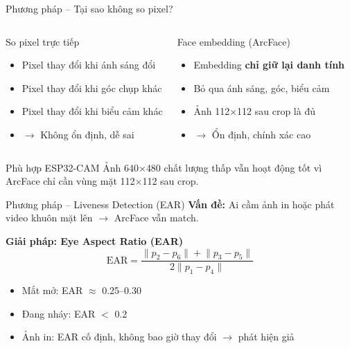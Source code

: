 \documentclass[aspectratio=169]{beamer}
\begin{document}
\begin{frame}{Phương pháp -- Tại sao không so pixel?}
  \begin{columns}[T]
      \begin{alertblock}{So pixel trực tiếp}
        \begin{itemize}
          \item Pixel thay đổi khi ánh sáng đổi
          \item Pixel thay đổi khi góc chụp khác
          \item Pixel thay đổi khi biểu cảm khác
          \item $\to$ Không ổn định, dễ sai
        \end{itemize}
      \end{alertblock}

      \begin{block}{Face embedding (ArcFace)}
        \begin{itemize}
          \item Embedding \textbf{chỉ giữ lại danh tính}
          \item Bỏ qua ánh sáng, góc, biểu cảm
          \item Ảnh 112$\times$112 sau crop là đủ
          \item $\to$ Ổn định, chính xác cao
        \end{itemize}
      \end{block}
  \end{columns}

  \vspace{0.6em}
  \begin{block}{Phù hợp ESP32-CAM}
    Ảnh 640$\times$480 chất lượng thấp vẫn hoạt động tốt vì ArcFace chỉ cần vùng mặt 112$\times$112 sau crop.
  \end{block}
\end{frame}

\begin{frame}{Phương pháp -- Liveness Detection (EAR)}
  \textbf{Vấn đề:} Ai cầm ảnh in hoặc phát video khuôn mặt lên $\to$ ArcFace vẫn match.

  \vspace{0.5em}
  \textbf{Giải pháp: Eye Aspect Ratio (EAR)}
  \[
    \text{EAR} = \frac{\lVert p_2-p_6\rVert + \lVert p_3-p_5\rVert}{2\lVert p_1-p_4\rVert}
  \]

  \begin{itemize}
    \item Mắt mở: EAR $\approx$ 0.25--0.30
    \item Đang nháy: EAR $<$ 0.2
    \item Ảnh in: EAR cố định, không bao giờ thay đổi $\to$ phát hiện giả
  \end{itemize}
\end{frame}
\end{document}
